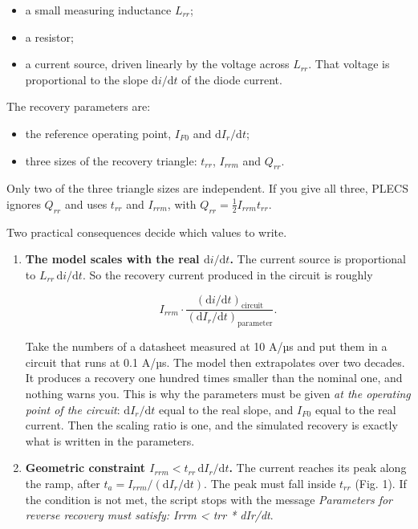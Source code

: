 \documentclass[11pt,a4paper,numbers=noenddot]{scrartcl}
\providecommand{\tightlist}{\setlength{\itemsep}{0pt}\setlength{\parskip}{0pt}}
\begin{document}
\begin{onehalfspace}
\begin{itemize}
\tightlist
\item
  a small measuring inductance \(L_{rr}\);
\item
  a resistor;
\item
  a current source, driven linearly by the voltage across \(L_{rr}\). That voltage is proportional to the slope \(\mathrm{d}i/\mathrm{d}t\) of the diode current.
\end{itemize}

The recovery parameters are:

\begin{itemize}
\tightlist
\item
  the reference operating point, \(I_{F0}\) and \(\mathrm{d}I_r/\mathrm{d}t\);
\item
  three sizes of the recovery triangle: \(t_{rr}\), \(I_{rrm}\) and \(Q_{rr}\).
\end{itemize}

Only two of the three triangle sizes are independent. If you give all three, PLECS ignores \(Q_{rr}\) and uses \(t_{rr}\) and \(I_{rrm}\), with \(Q_{rr} = \tfrac{1}{2} I_{rrm} t_{rr}\).

Two practical consequences decide which values to write.

\begin{enumerate}
\def\labelenumi{\arabic{enumi}.}
\item
  \textbf{The model scales with the real \(\mathrm{d}i/\mathrm{d}t\).} The current source is proportional to \(L_{rr}\,\mathrm{d}i/\mathrm{d}t\). So the recovery current produced in the circuit is roughly

  \[I_{rrm} \cdot \frac{(\mathrm{d}i/\mathrm{d}t)_{\text{circuit}}}{(\mathrm{d}I_r/\mathrm{d}t)_{\text{parameter}}}.\]

  Take the numbers of a datasheet measured at 10 A/µs and put them in a circuit that runs at 0.1 A/µs. The model then extrapolates over two decades. It produces a recovery one hundred times smaller than the nominal one, and nothing warns you. This is why the parameters must be given \emph{at the operating point of the circuit}: \(\mathrm{d}I_r/\mathrm{d}t\) equal to the real slope, and \(I_{F0}\) equal to the real current. Then the scaling ratio is one, and the simulated recovery is exactly what is written in the parameters.
\item
  \textbf{Geometric constraint \(I_{rrm} < t_{rr}\,\mathrm{d}I_r/\mathrm{d}t\).} The current reaches its peak along the ramp, after \(t_a = I_{rrm}/(\mathrm{d}I_r/\mathrm{d}t)\). The peak must fall inside \(t_{rr}\) (Fig. 1). If the condition is not met, the script stops with the message \emph{Parameters for reverse recovery must satisfy: Irrm \textless{} trr * dIr/dt}.
\end{enumerate}


\end{onehalfspace}
\end{document}
